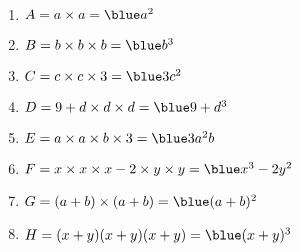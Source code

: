 \begin{colonne*exercice}
\begin{corrige}
   \ \\ [-5mm]
   \begin{enumerate}
      \item $A =a\times a =\blue a^2$
      \item $B =b\times b\times b =\blue b^3$
      \item $C =c\times c\times3 =\blue3c^2$
      \item $D =9+d\times d\times d =\blue9+d^3$
      \item $E =a\times a\times b\times3 =\blue3a^2b$
      \item $F =x\times x\times x-2\times y\times y =\blue x^3-2y^2$
      \item $G =(a+b)\times(a+b) =\blue(a+b)^2$
      \item $H =(x+y)(x+y)(x+y) =\blue(x+y)^3$ \medskip
   \end{enumerate}
\end{corrige}


\end{colonne*exercice}


\Recreation

\def\croix{\psframe(0,-1)(1,2) \psframe(-1,-0)(2,1)}
\def\carre{\psframe(0,0)(1,1)}

